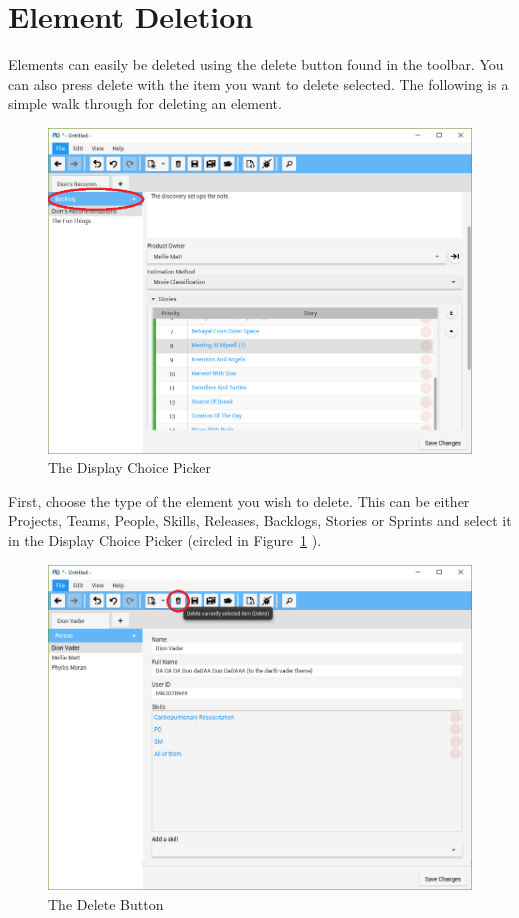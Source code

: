 \section{Element Deletion}

Elements can easily be deleted using the delete button found in the toolbar. You can also press delete with the item you want to delete selected. The following is a simple walk through for deleting an element.

\begin{figure}[H]
\centering
\includegraphics[width=\textwidth]{images/screenshots/deletion1.PNG}
\caption{The Display Choice Picker}
\label{fig:display_choice_picker}
\end{figure}

First, choose the type of the element you wish to delete. This can be either Projects, Teams, People, Skills, Releases, Backlogs, Stories or Sprints and select it in the Display Choice Picker (circled in Figure~\ref{fig:display_choice_picker} ).

\begin{figure}[H]
	\centering
	\includegraphics[width=\textwidth]{images/screenshots/deletion2.PNG}
	\caption{The Delete Button}
	\label{fig:ed_delete_button}
\end{figure}

